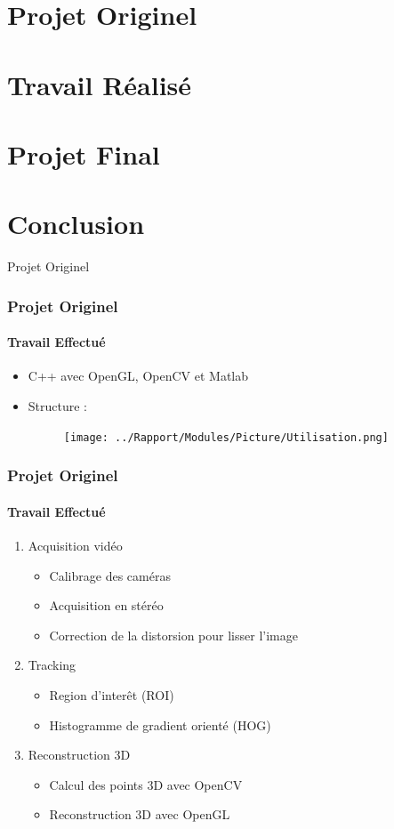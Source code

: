 \documentclass[12pt]{beamer}
\begin{document}
\section{Projet Originel}
\section{Travail Réalisé}
\section{Projet Final}
\section{Conclusion}

\begin{frame}
\Huge{\centerline{Projet Originel}}
\end{frame}

\begin{frame}
\frametitle{Projet Originel}
\framesubtitle{Travail Effectué}
\begin{itemize}
\item{C++ avec OpenGL, OpenCV et Matlab}
\item Structure :
\begin{figure}
\texttt{[image: ../Rapport/Modules/Picture/Utilisation.png]}
\end{figure}
\end{itemize}
\end{frame}

\begin{frame}
\frametitle{Projet Originel}
\framesubtitle{Travail Effectué}
\begin{enumerate}
\item Acquisition vidéo
\begin{itemize}
\item Calibrage des caméras
\item Acquisition en stéréo
\item Correction de la distorsion pour lisser l'image
\end{itemize}
\item Tracking
\begin{itemize}
\item Region d'interêt (ROI)
\item Histogramme de gradient orienté (HOG)
\end{itemize}
\item Reconstruction 3D
\begin{itemize}
\item Calcul des points 3D avec OpenCV
\item Reconstruction 3D avec OpenGL
\end{itemize}
\end{enumerate}
\end{frame}
\end{document}
